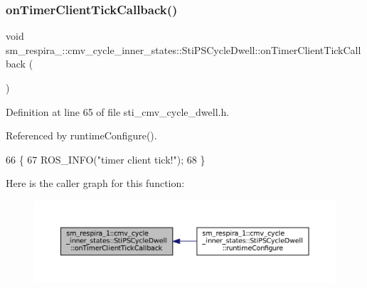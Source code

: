 \subsubsection{\texorpdfstring{on\+Timer\+Client\+Tick\+Callback()}{onTimerClientTickCallback()}}
{\footnotesize\ttfamily void sm\+\_\+respira\+\_\+::cmv\+\_\+cycle\+\_\+inner\+\_\+states\+::\+Sti\+P\+S\+Cycle\+Dwell\+::on\+Timer\+Client\+Tick\+Callback (\begin{DoxyParamCaption}{ }\end{DoxyParamCaption})\hspace{0.3cm}{\ttfamily [inline]}}



Definition at line 65 of file sti\+\_\+cmv\+\_\+cycle\+\_\+dwell.\+h.



Referenced by runtime\+Configure().


\begin{DoxyCode}
66   \{
67     ROS\_INFO(\textcolor{stringliteral}{"timer client tick!"});
68   \}
\end{DoxyCode}
Here is the caller graph for this function\+:
\nopagebreak
\begin{figure}[H]
\begin{center}
\leavevmode
\includegraphics[width=350pt]{structsm__respira__1_1_1cmv__cycle__inner__states_1_1StiPSCycleDwell_afe30abee5a61aa4c170db555ec7e2697_icgraph}
\end{center}
\end{figure}
\mbox{\label{structsm__respira__1_1_1cmv__cycle__inner__states_1_1StiPSCycleDwell_a1cbdbf655b548f4999c36faef3ba0528}} 
